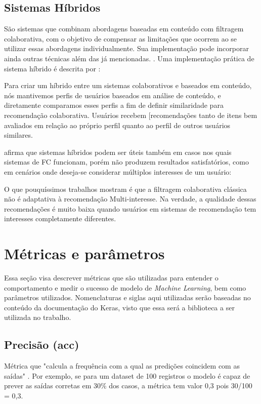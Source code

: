 \subsection{Sistemas Híbridos}
São sistemas que combinam abordagens baseadas em conteúdo com filtragem colaborativa, com o objetivo de compensar as limitações que ocorrem ao se utilizar essas abordagens individualmente. Sua implementação pode incorporar ainda outras técnicas além das já mencionadas. \cite{fressato19}. Uma implementação prática de sistema híbrido é descrita por :

\begin{citacao}
Para criar um híbrido entre um sistemas colaborativos e baseados em conteúdo, nós mantivemos perfis de usuários baseados em análise de conteúdo, e diretamente comparamos esses perfis a fim de definir similaridade para recomendação colaborativa. Usuários recebem [recomendações tanto de itens bem avaliados em relação ao próprio perfil quanto ao perfil de outros usuários similares.
\end{citacao}

 afirma que sistemas híbridos podem ser úteis também em casos nos quais sistemas de FC funcionam, porém não produzem resultados satisfatórios, como em cenários onde deseja-se considerar múltiplos interesses de um usuário:

\begin{citacao}
O que pouquíssimos trabalhos mostram é que a filtragem colaborativa clássica não é adaptativa à recomendação Multi-interesse. Na verdade, a qualidade dessas recomendações é muito baixa quando usuários em sistemas de recomendação tem interesses completamente diferentes.
\end{citacao}

\section {Métricas e parâmetros}
Essa seção visa descrever métricas que são utilizadas para entender o comportamento e medir o sucesso de modelo de \textit{Machine Learning}, bem como parâmetros utilizados. Nomenclaturas e siglas aqui utilizadas serão baseadas no conteúdo da documentação do Keras, visto que essa será a biblioteca a ser utilizada no trabalho.

\subsection{Precisão (acc)}
Métrica que "calcula a frequência com a qual as predições coincidem com as saídas" \cite{keras204}. Por exemplo, se para um dataset de 100 registros o modelo é capaz de prever as saídas corretas em 30\% dos casos, a métrica tem valor 0,3 pois 30/100 = 0,3.

